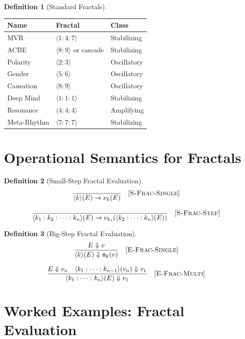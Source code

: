 \documentclass[11pt,twoside,openright]{book}
\theoremstyle{definition}
\newtheorem{definition}{Definition}[chapter]
\theoremstyle{plain}
\theoremstyle{remark}
\newcommand{\noe}[1]{\nu_{#1}}
\newcommand{\smallstep}{\to}
\newcommand{\bigstep}{\Downarrow}
\begin{document}
\begin{definition}[Standard Fractals]
\label{def:standard-fractals}
\begin{center}
\begin{tabular}{lll}
\toprule
\textbf{Name} & \textbf{Fractal} & \textbf{Class} \\
\midrule
MVR & $\langle 1 : 4 : 7 \rangle$ & Stabilizing \\
ACBE & $\langle 8 : 9 \rangle$ or cascade & Stabilizing \\
Polarity & $\langle 2 : 3 \rangle$ & Oscillatory \\
Gender & $\langle 5 : 6 \rangle$ & Oscillatory \\
Causation & $\langle 8 : 9 \rangle$ & Oscillatory \\
Deep Mind & $\langle 1 : 1 : 1 \rangle$ & Stabilizing \\
Resonance & $\langle 4 : 4 : 4 \rangle$ & Amplifying \\
Meta-Rhythm & $\langle 7 : 7 : 7 \rangle$ & Stabilizing \\
\bottomrule
\end{tabular}
\end{center}
\end{definition}

\section{Operational Semantics for Fractals}

\begin{definition}[Small-Step Fractal Evaluation]
\label{def:fractal-smallstep}
\[
\frac{}{\langle k \rangle(E) \smallstep \noe{k}(E)} \quad [\textsc{S-Frac-Single}]
\]

\[
\frac{}{\langle k_1 : k_2 : \cdots : k_n \rangle(E) \smallstep \noe{k_1}(\langle k_2 : \cdots : k_n \rangle(E))} \quad [\textsc{S-Frac-Step}]
\]
\end{definition}

\begin{definition}[Big-Step Fractal Evaluation]
\label{def:fractal-bigstep}
\[
\frac{E \bigstep v}{\langle k \rangle(E) \bigstep \mathfrak{n}_k(v)} \quad [\textsc{E-Frac-Single}]
\]

\[
\frac{E \bigstep v_n \quad \langle k_1 : \cdots : k_{n-1} \rangle(v_n) \bigstep v_1}{\langle k_1 : \cdots : k_n \rangle(E) \bigstep v_1} \quad [\textsc{E-Frac-Multi}]
\]
\end{definition}

\section{Worked Examples: Fractal Evaluation}
\end{document}
